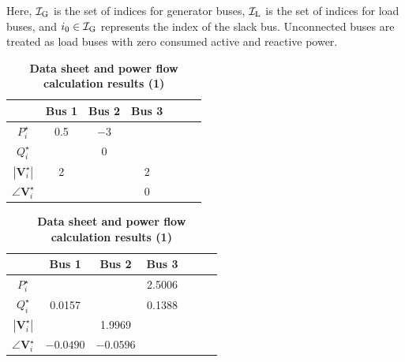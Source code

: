 \documentclass[graybox, envcountchap]{svmult}
\begin{document}
Here, $\mathcal{I}_{\rm G}$ is the set of indices for generator buses,
$\mathcal{I}_{\rm L}$ is the set of indices for load buses, and $i_0 \in
\mathcal{I}_{\rm G}$ represents the index of the slack bus. Unconnected buses
are treated as load buses with zero consumed active and reactive power.


%


\begin{table}[ht]
\medskip
\caption{\textbf{Data sheet and power flow calculation results (1)}} \label{table:pflow1}
 \centering
  {
  \begin{minipage}{0.49\linewidth}
    \centering
  \begin{tabular}{|c|c|c|c|c|c|c|}
   \hline
 & Bus 1 & Bus 2 & Bus 3 \\
   \hline 
   $P_i^{\star}$ & 0.5 & $-3$ & \\
   \hline
   $Q_i^{\star}$ &  & 0 & \\
   \hline
   $|\bm{V}_i^{\star}|$ & 2 & & 2 \\
   \hline
   $\angle \bm{V}_i^{\star}$ & & & 0 \\
   \hline
  \end{tabular}
  \end{minipage}
  \begin{minipage}{0.49\linewidth}
    \centering
  \begin{tabular}{|c|c|c|c|c|c|c|}
   \hline
 & Bus 1 & Bus 2 & Bus 3 \\
   \hline 
   $P_i^{\star}$ & & & 2.5006 \\
   \hline
   $Q_i^{\star}$ & 0.0157 & & 0.1388 \\
   \hline
   $|\bm{V}_i^{\star}|$ & & 1.9969 & \\
   \hline
   $\angle \bm{V}_i^{\star}$ & $-0.0490$ & $-0.0596$ & \\
   \hline
  \end{tabular}
  \end{minipage}
  }
\end{table}
\end{document}

